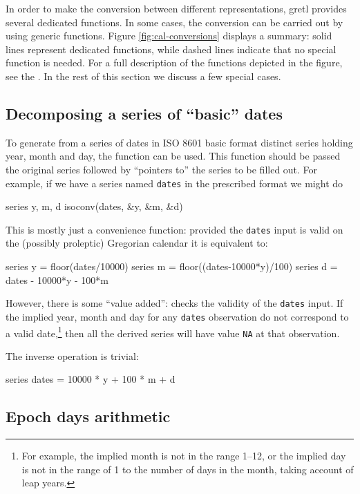 In order to make the conversion between different representations,
gretl provides several dedicated functions. In some cases, the
conversion can be carried out by using generic functions. Figure
\ref{fig:cal-conversions} displays a summary: solid lines represent
dedicated functions, while dashed lines indicate that no special
function is needed. For a full description of the functions depicted
in the figure, see the \GCR. In the rest of this section we discuss a
few special cases.

\subsection{Decomposing a series of ``basic'' dates}

To generate from a series of dates in ISO 8601 basic format distinct
series holding year, month and day, the function  can be
used. This function should be passed the original series followed by
``pointers to'' the series to be filled out. For example, if we have a
series named \texttt{dates} in the prescribed format we might do
%
\begin{code}
series y, m, d
isoconv(dates, &y, &m, &d)
\end{code}

This is mostly just a convenience function: provided the
\texttt{dates} input is valid on the (possibly proleptic) Gregorian
calendar it is equivalent to:
%
\begin{code}
series y = floor(dates/10000)
series m = floor((dates-10000*y)/100)
series d = dates - 10000*y - 100*m
\end{code}

However, there is some ``value added'':  checks the
validity of the \texttt{dates} input. If the implied year, month and
day for any \texttt{dates} observation do not correspond to a valid
date,\footnote{For example, the implied month is not in the range
  1--12, or the implied day is not in the range of 1 to the number of
  days in the month, taking account of leap years.} then all the
derived series will have value \texttt{NA} at that observation.

The inverse operation is trivial:
\begin{code}
series dates = 10000 * y + 100 * m + d
\end{code}

\subsection{Epoch days arithmetic}

